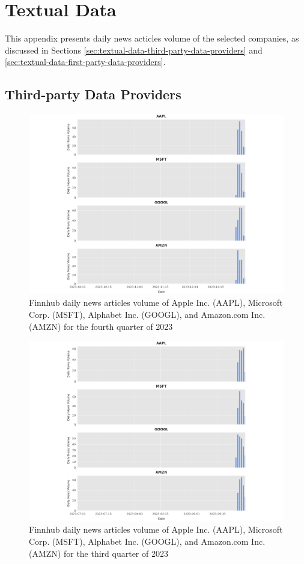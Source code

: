 \chapter{Textual Data}
\label{app:textual-data}
This appendix presents daily news acticles volume of the selected companies, as discussed in Sections \ref{sec:textual-data-third-party-data-providers} and \ref{sec:textual-data-first-party-data-providers}.

\section{Third-party Data Providers}
\label{appsec:third-party-data-providers}

\begin{figure}[htbp]
  \centering
  \includegraphics[width=\textwidth]{img/textual-data/q4-2023-a.pdf}
  \caption{Finnhub daily news articles volume of Apple Inc. (AAPL), Microsoft Corp. (MSFT), Alphabet Inc. (GOOGL), and Amazon.com Inc. (AMZN) for the fourth quarter of 2023}
  \label{fig:finnhub-q4-2023}
\end{figure}

\begin{figure}[htbp]
  \centering
  \includegraphics[width=\textwidth]{img/textual-data/q3-2023-a.pdf}
  \caption{Finnhub daily news articles volume of Apple Inc. (AAPL), Microsoft Corp. (MSFT), Alphabet Inc. (GOOGL), and Amazon.com Inc. (AMZN) for the third quarter of 2023}
  \label{fig:finnhub-q3-2023}
\end{figure}

